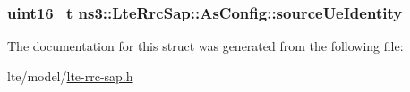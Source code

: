 \subsubsection[{\texorpdfstring{source\+Ue\+Identity}{sourceUeIdentity}}]{\setlength{\rightskip}{0pt plus 5cm}uint16\+\_\+t ns3\+::\+Lte\+Rrc\+Sap\+::\+As\+Config\+::source\+Ue\+Identity}\hypertarget{structns3_1_1LteRrcSap_1_1AsConfig_a29f8fddb659f258d7250a35282cc85ca}{}\label{structns3_1_1LteRrcSap_1_1AsConfig_a29f8fddb659f258d7250a35282cc85ca}


The documentation for this struct was generated from the following file\+:\begin{DoxyCompactItemize}
\item 
lte/model/\hyperlink{lte-rrc-sap_8h}{lte-\/rrc-\/sap.\+h}\end{DoxyCompactItemize}
